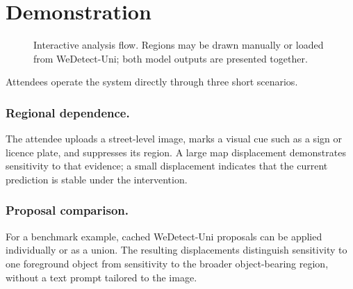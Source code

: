\section{Demonstration}
\label{sec:demo}

\begin{figure}[t]
  \centering
  \small
  \caption{Interactive analysis flow. Regions may be drawn manually or loaded
  from WeDetect-Uni; both model outputs are presented together.}
  \label{fig:interaction_flow}
  \vspace{-2mm}
\end{figure}

Attendees operate the system directly through three short scenarios.

\subsubsection{Regional dependence.}
The attendee uploads a street-level image, marks a visual cue such as a sign or
licence plate, and suppresses its region. A large map displacement demonstrates
sensitivity to that evidence; a small displacement indicates that the current
prediction is stable under the intervention.

\subsubsection{Proposal comparison.}
For a benchmark example, cached WeDetect-Uni proposals can be applied
individually or as a union. The resulting displacements distinguish sensitivity
to one foreground object from sensitivity to the broader object-bearing region,
without a text prompt tailored to the image.

